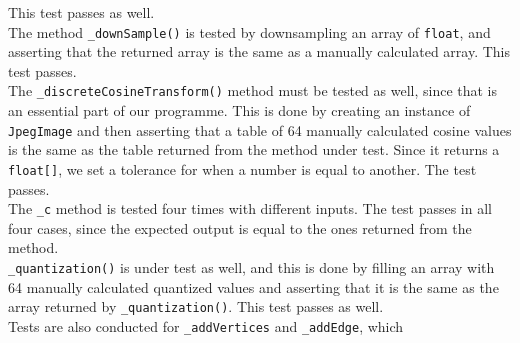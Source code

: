 This test passes as well.\\
The method \lstinline|_downSample()| is tested by downsampling an array of \lstinline|float|, and asserting that the returned array is the same as a manually calculated array.
This test passes.\\
The \lstinline|_discreteCosineTransform()| method must be tested as well, since that is an essential part of our programme.
This is done by creating an instance of \lstinline|JpegImage| and then asserting that a table of 64 manually calculated cosine values is the same as the table returned from the method under test.
Since it returns a \lstinline|float[]|, we set a tolerance for when a number is equal to another.
The test passes.\\
The \lstinline|_c| method is tested four times with different inputs.
The test passes in all four cases, since the expected output is equal to the ones returned from the method.\\
\lstinline|_quantization()| is under test as well, and this is done by filling an array with 64 manually calculated quantized values and asserting that it is the same as the array returned by \lstinline|_quantization()|.
This test passes as well.\\
Tests are also conducted for \lstinline|_addVertices| and \lstinline|_addEdge|, which 


